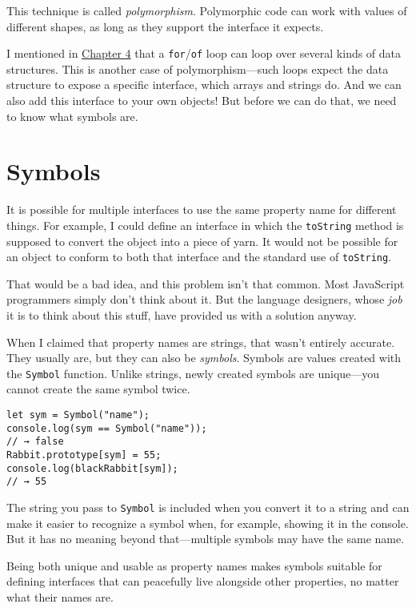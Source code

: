 This technique is called \emph{polymorphism}. Polymorphic code can work with values of different shapes, as long as they support the interface it expects.

I mentioned in \hyperref[data.for_of_loop]{Chapter 4} that a \lstinline`for`/\lstinline`of` loop can loop over several kinds of data structures. This is another case of polymorphism—such loops expect the data structure to expose a specific interface, which arrays and strings do. And we can also add this interface to your own objects! But before we can do that, we need to know what symbols are.

\section{Symbols}

It is possible for multiple interfaces to use the same property name for different things. For example, I could define an interface in which the \lstinline`toString` method is supposed to convert the object into a piece of yarn. It would not be possible for an object to conform to both that interface and the standard use of \lstinline`toString`.

That would be a bad idea, and this problem isn't that common. Most JavaScript programmers simply don't think about it. But the language designers, whose \emph{job} it is to think about this stuff, have provided us with a solution anyway.

When I claimed that property names are strings, that wasn't entirely accurate. They usually are, but they can also be \emph{symbols}. Symbols are values created with the \lstinline`Symbol` function. Unlike strings, newly created symbols are unique—you cannot create the same symbol twice.

\begin{lstlisting}
let sym = Symbol("name");
console.log(sym == Symbol("name"));
// → false
Rabbit.prototype[sym] = 55;
console.log(blackRabbit[sym]);
// → 55
\end{lstlisting}
\noindent

The string you pass to \lstinline`Symbol` is included when you convert it to a string and can make it easier to recognize a symbol when, for example, showing it in the console. But it has no meaning beyond that—multiple symbols may have the same name.

Being both unique and usable as property names makes symbols suitable for defining interfaces that can peacefully live alongside other properties, no matter what their names are.


